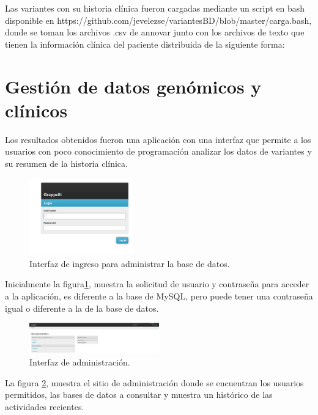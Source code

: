 Las variantes con su historia clínica fueron cargadas mediante un script en bash disponible en https://github.com/jevelezse/variantesBD/blob/master/carga.bash, donde se toman los archivos .csv de annovar junto con los archivos de texto que tienen la información clínica del paciente distribuida de la siguiente forma:

\section{Gestión de datos genómicos y clínicos}

Los resultados obtenidos fueron una aplicación con una interfaz que permite a los usuarios con poco conocimiento de  programación  analizar los datos de variantes y su resumen de la historia clínica. \\

\begin{figure}[h] 
	\centering
	\includegraphics[width=0.4\textwidth]{Kap3/admin_django}
	\caption{Interfaz de ingreso para  administrar la base de datos.} \label{fig:admin}
\end{figure}

Inicialmente la figura\ref{fig:admin}, muestra la solicitud de usuario y contraseña para acceder a la aplicación, es diferente a la base de MySQL, pero  puede tener  una contraseña igual o diferente a la de la base de datos.

\begin{figure}[h] 
	\centering
	\includegraphics[width=0.5\textwidth]{Kap3/django_admin}
	\caption{Interfaz de administración.} \label{fig:admin2}
\end{figure}

La figura \ref{fig:admin2}, muestra el sitio de administración donde se encuentran los usuarios permitidos, las bases de datos a consultar y muestra un histórico de las actividades recientes. \\


